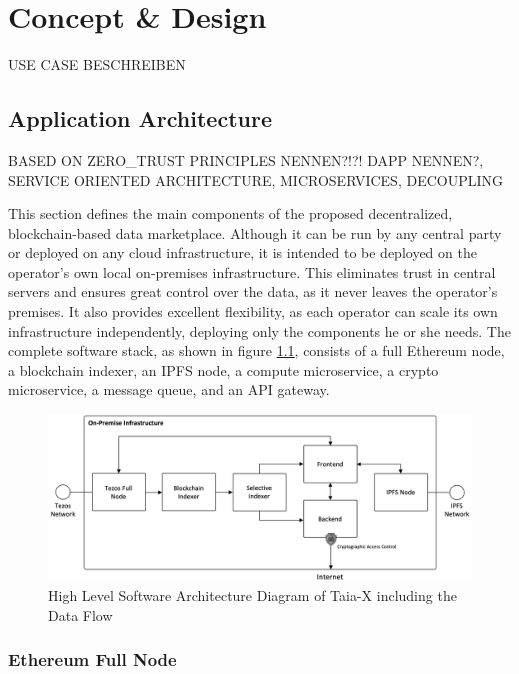 \chapter{Concept \& Design}
\label{cha:cod}

USE CASE BESCHREIBEN

\section{Application Architecture}
\label{section:software_architecture}

BASED ON ZERO_TRUST PRINCIPLES NENNEN?!?! DAPP NENNEN?, SERVICE ORIENTED ARCHITECTURE, MICROSERVICES, DECOUPLING

This section defines the main components of the proposed decentralized, blockchain-based data marketplace. Although it can be run by any central party or deployed on any cloud infrastructure, it is intended to be deployed on the operator's own local on-premises infrastructure. This eliminates trust in central servers and ensures great control over the data, as it never leaves the operator's premises. It also provides excellent flexibility, as each operator can scale its own infrastructure independently, deploying only the components he or she needs. The complete software stack, as shown in figure \ref{fig:arch}, consists of a full Ethereum node, a blockchain indexer, an IPFS node, a compute microservice, a crypto microservice, a message queue, and an API gateway.

\begin{figure}[!htb]
    \centering
    \includegraphics[width=14cm]{images/arch.png}
    \caption[High Level Software Architecture Diagram of Taia-X]{High Level Software Architecture Diagram of Taia-X including the Data Flow}
    \label{fig:arch}
\end{figure}

\subsection{Ethereum Full Node}

